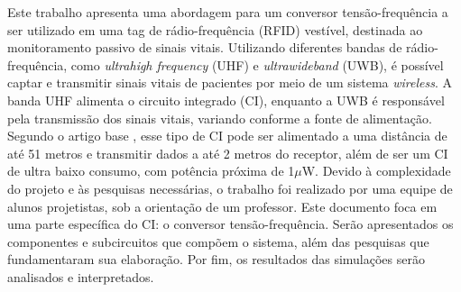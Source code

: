 \begin{resumo}




Este trabalho apresenta uma abordagem para um conversor tensão-frequência a ser utilizado em uma tag de rádio-frequência (RFID) vestível, destinada ao monitoramento passivo de sinais vitais. Utilizando diferentes bandas de rádio-frequência, como \textit{ultrahigh frequency} (UHF) e \textit{ultrawideband} (UWB), é possível captar e transmitir sinais vitais de pacientes por meio de um sistema \textit{wireless}. A banda UHF alimenta o circuito integrado (CI), enquanto a UWB é responsável pela transmissão dos sinais vitais, variando conforme a fonte de alimentação. Segundo o artigo base \cite{artigo_principal}, esse tipo de CI pode ser alimentado a uma distância de até 51 metros e transmitir dados a até 2 metros do receptor, além de ser um CI de ultra baixo consumo, com potência próxima de 1$\mu$W. Devido à complexidade do projeto e às pesquisas necessárias, o trabalho foi realizado por uma equipe de alunos projetistas, sob a orientação de um professor. Este documento foca em uma parte específica do CI: o conversor tensão-frequência. Serão apresentados os componentes e subcircuitos que compõem o sistema, além das pesquisas que fundamentaram sua elaboração. Por fim, os resultados das simulações serão analisados e interpretados.


\end{resumo}
